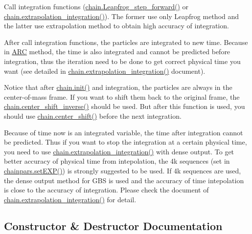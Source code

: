 \begin{DoxyEnumerate}
\item Call integration functions (\hyperlink{classARC_1_1chain_a82b26731761231d86fd2e0b4529df6fa}{chain.\+Leapfrog\+\_\+step\+\_\+forward()} or \hyperlink{classARC_1_1chain_a0eb7768cb1b9099bbf66124d4c00164c}{chain.\+extrapolation\+\_\+integration()}). The former use only Leapfrog method and the latter use extrapolation method to obtain high accuracy of integration.
\item After call integration functions, the particles are integrated to new time. Because in \hyperlink{namespaceARC}{A\+RC} method, the time is also integrated and cannot be predicted before integration, thus the iteration need to be done to get correct physical time you want (see detailed in \hyperlink{classARC_1_1chain_a0eb7768cb1b9099bbf66124d4c00164c}{chain.\+extrapolation\+\_\+integration()} document).
\item Notice that after \hyperlink{classARC_1_1chain_aa016cf633d19079dca24565b80a36a3f}{chain.\+init()} and integration, the particles are always in the center-\/of-\/mass frame. If you want to shift them back to the original frame, the \hyperlink{classARC_1_1chain_a52edc1843550578f5be5590b7403ef97}{chain.\+center\+\_\+shift\+\_\+inverse()} should be used. But after this function is used, you should use \hyperlink{classARC_1_1chain_a68ae268afb418455bfdd6e8101b3b4eb}{chain.\+center\+\_\+shift()} before the next integration.
\end{DoxyEnumerate}

Because of time now is an integrated variable, the time after integration cannot be predicted. Thus if you want to stop the integration at a certain physical time, you need to use \hyperlink{classARC_1_1chain_a0eb7768cb1b9099bbf66124d4c00164c}{chain.\+extrapolation\+\_\+integration()} with dense output. To get better accuracy of physical time from intepolation, the 4k sequences (set in \hyperlink{classARC_1_1chainpars_a1bef542db30755ac35cf064446874f6d}{chainpars.\+set\+E\+X\+P()}) is strongly suggested to be used. If 4k sequences are used, the dense output method for G\+BS is used and the accuracy of time intepolation is close to the accuracy of integration. Please check the document of \hyperlink{classARC_1_1chain_a0eb7768cb1b9099bbf66124d4c00164c}{chain.\+extrapolation\+\_\+integration()} for detail. 

\subsection{Constructor \& Destructor Documentation}
\hypertarget{classARC_1_1chain_a38fc886b32c9496571b1649e784583a3}{}\label{classARC_1_1chain_a38fc886b32c9496571b1649e784583a3} 
